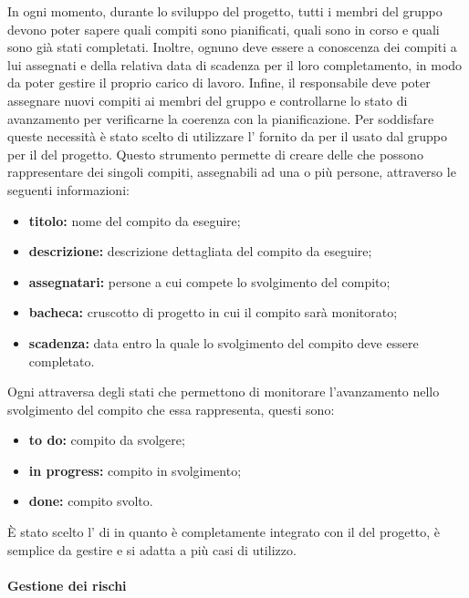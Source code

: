 			In ogni momento, durante lo sviluppo del progetto, tutti i membri del gruppo devono poter sapere quali compiti sono pianificati, quali sono in corso e quali sono già stati completati. Inoltre, ognuno deve essere a conoscenza dei compiti a lui assegnati e della relativa data di scadenza per il loro completamento, in modo da poter gestire il proprio carico di lavoro. Infine, il responsabile deve poter assegnare nuovi compiti ai membri del gruppo e controllarne lo stato di avanzamento per verificarne la coerenza con la pianificazione.
			\newline
			Per soddisfare queste necessità è stato scelto di utilizzare l' fornito da  per il  usato dal gruppo per il  del progetto.
			\newline
			Questo strumento permette di creare delle  che possono rappresentare dei singoli compiti, assegnabili ad una o più persone, attraverso le seguenti informazioni:
			\begin{itemize}
				\item \textbf{titolo:} nome del compito da eseguire;
				\item \textbf{descrizione:} descrizione dettagliata del compito da eseguire;
				\item \textbf{assegnatari:} persone a cui compete lo svolgimento del compito;
				\item \textbf{bacheca:} cruscotto di progetto in cui il compito sarà monitorato;
				\item \textbf{scadenza:} data entro la quale lo svolgimento del compito deve essere completato.
			\end{itemize}
			Ogni  attraversa degli stati che permettono di monitorare l'avanzamento nello svolgimento del compito che essa rappresenta, questi sono:
			\begin{itemize}
				\item \textbf{to do:} compito da svolgere;
				\item \textbf{in progress:} compito in svolgimento;
				\item \textbf{done:} compito svolto.
			\end{itemize}
			È stato scelto l' di  in quanto è completamente integrato con il  del progetto, è semplice da gestire e si adatta a più casi di utilizzo.

		\paragraph{Gestione dei rischi}

